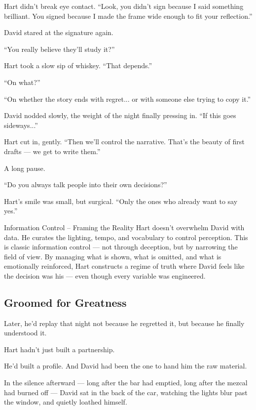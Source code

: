 Hart didn’t break eye contact. “Look, you didn’t sign because I said something brilliant. You signed because I made the frame wide enough to fit your reflection.”


David stared at the signature again.

“You really believe they’ll study it?”

Hart took a slow sip of whiskey. “That depends.”

“On what?”

“On whether the story ends with regret... or with someone else trying to copy it.”

David nodded slowly, the weight of the night finally pressing in. “If this goes sideways...”

Hart cut in, gently. “Then we’ll control the narrative. That’s the beauty of first drafts — we get to write them.”

A long pause.

“Do you always talk people into their own decisions?”

Hart’s smile was small, but surgical. “Only the ones who already want to say yes.”

\begin{PsychologicalSidebar}{Information Control – Framing the Reality}
Hart doesn’t overwhelm David with data. He curates the lighting, tempo, and vocabulary to control perception.
This is classic information control — not through deception, but by narrowing the field of view.
By managing what is shown, what is omitted, and what is emotionally reinforced, Hart constructs a regime of truth
where David feels like the decision was his — even though every variable was engineered.
\end{PsychologicalSidebar}


\subsection{Groomed for Greatness}

Later, he’d replay that night not because he regretted it, but because he finally understood it.

Hart hadn’t just built a partnership.

He’d built a profile.
And David had been the one to hand him the raw material.

In the silence afterward — long after the bar had emptied, long after the mezcal had burned off — David 
sat in the back of the car, watching the lights blur past the window, and quietly loathed himself.

